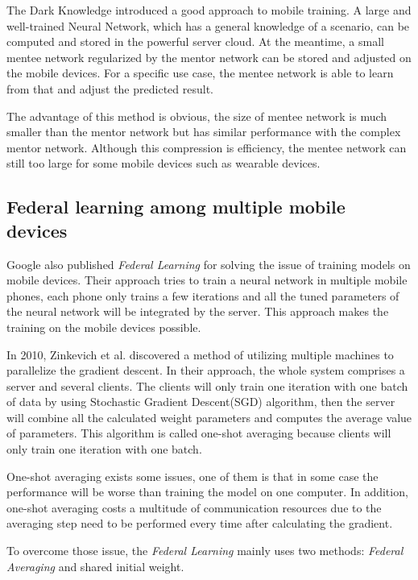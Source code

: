 \documentclass[article]{aaltoseries}
\begin{document}
The Dark Knowledge introduced a good approach to mobile training. 
A large and well-trained Neural Network, which has a general knowledge of a scenario, can be computed and stored in the powerful server cloud.
At the meantime, a small mentee network regularized by the mentor network can be stored and adjusted on the mobile devices.
For a specific use case, the mentee network is able to learn from that and adjust the predicted result. 



The advantage of this method is obvious, 
the size of mentee network is much smaller than the mentor network but has similar performance
with the complex mentor network. 
Although this compression is efficiency, the mentee network can still too large for some mobile
devices such as wearable devices.


\subsection{Federal learning among multiple mobile devices}
\label{sub_sec:federal_learning}

Google also published \emph{Federal Learning} for solving the issue of training models on mobile devices.
Their approach tries to train a neural network in multiple mobile phones, each phone only trains a few iterations
and all the tuned parameters of the neural network will be integrated by the server. 
This approach makes the training on the mobile devices possible.

In 2010, Zinkevich et al.\cite{Zinkevich2010} discovered a method of utilizing multiple machines to parallelize the gradient descent.
In their approach, the whole system comprises a server and several clients. 
The clients will only train one iteration with one batch of data by using Stochastic Gradient Descent(SGD) algorithm, 
then the server will combine all the calculated weight parameters and computes the average value of parameters.
This algorithm is called one-shot averaging because clients will only train one iteration with one batch.

One-shot averaging exists some issues, one of them is that in some case the performance will be worse than training
the model on one computer\cite{Shamir2013}. In addition, one-shot averaging costs a multitude of communication resources
due to the averaging step need to be performed every time after calculating the gradient.


To overcome those issue, the \emph{Federal Learning} mainly uses two methods: \emph{Federal Averaging} 
and shared initial weight.
\end{document}
